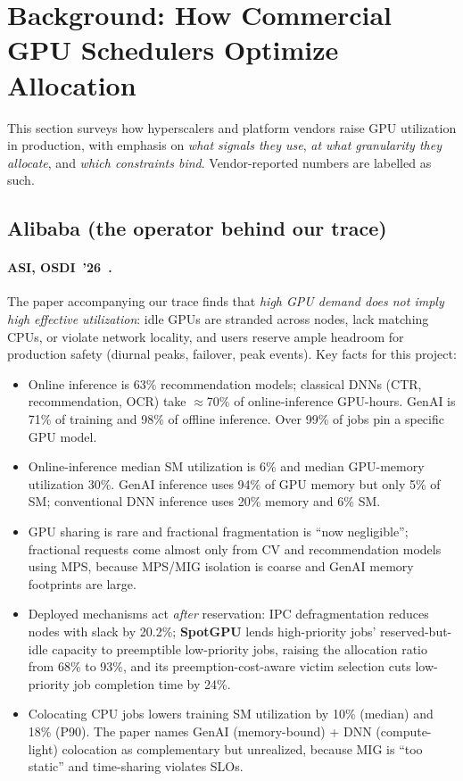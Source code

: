 \section{Background: How Commercial GPU Schedulers Optimize Allocation}
\label{sec:industry}

This section surveys how hyperscalers and platform vendors raise GPU utilization in production, with emphasis on \emph{what signals they use}, \emph{at what granularity they allocate}, and \emph{which constraints bind}. Vendor-reported numbers are labelled as such.

\subsection{Alibaba (the operator behind our trace)}

\paragraph{ASI, OSDI~'26~\cite{li2026asi}.} The paper accompanying our trace finds that \emph{high GPU demand does not imply high effective utilization}: idle GPUs are stranded across nodes, lack matching CPUs, or violate network locality, and users reserve ample headroom for production safety (diurnal peaks, failover, peak events). Key facts for this project:
\begin{itemize}
  \item Online inference is 63\% recommendation models; classical DNNs (CTR, recommendation, OCR) take $\approx$70\% of online-inference GPU-hours. GenAI is 71\% of training and 98\% of offline inference. Over 99\% of jobs pin a specific GPU model.
  \item Online-inference median SM utilization is 6\% and median GPU-memory utilization 30\%. GenAI inference uses 94\% of GPU memory but only 5\% of SM; conventional DNN inference uses 20\% memory and 6\% SM.
  \item GPU sharing is rare and fractional fragmentation is ``now negligible''; fractional requests come almost only from CV and recommendation models using MPS, because MPS/MIG isolation is coarse and GenAI memory footprints are large.
  \item Deployed mechanisms act \emph{after} reservation: IPC defragmentation reduces nodes with slack by 20.2\%; \textbf{SpotGPU} lends high-priority jobs' reserved-but-idle capacity to preemptible low-priority jobs, raising the allocation ratio from 68\% to 93\%, and its preemption-cost-aware victim selection cuts low-priority job completion time by 24\%.
  \item Colocating CPU jobs lowers training SM utilization by 10\% (median) and 18\% (P90). The paper names GenAI (memory-bound) + DNN (compute-light) colocation as complementary but unrealized, because MIG is ``too static'' and time-sharing violates SLOs.
\end{itemize}

